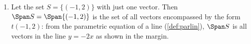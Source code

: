 \begin{example} \label{eg:span}
\begin{enumerate}
\item Let the set \(S=\{(-1,2)\}\) with just one vector.  
%
Then \(\Span S=\Span\{(-1,2)\}\) is the set of all vectors encompassed by the form \(t(-1,2)\): from the parametric equation of a line (\autoref{def:parlin}), \(\Span S\) is all vectors in the line \(y=-2x\) as shown in the margin.


\end{enumerate}
\end{example}
